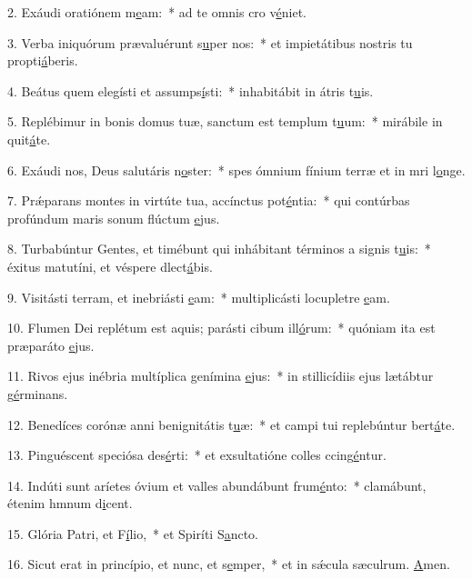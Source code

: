 2. Exáudi oratiónem m\uline{e}am:~* ad te omnis cro v\uline{é}niet.\par 
3. Verba iniquórum prævaluérunt s\uline{u}per nos:~* et impietátibus nostris tu propti\uline{á}beris.\par 
4. Beátus quem elegísti et assumps\uline{í}sti:~* inhabitábit in átris t\uline{u}is.\par 
5. Replébimur in bonis domus tuæ, sanctum est templum t\uline{u}um:~* mirábile in quit\uline{á}te.\par 
6. Exáudi nos, Deus salutáris n\uline{o}ster:~* spes ómnium fínium terræ et in mri l\uline{o}nge.\par 
7. Prǽparans montes in virtúte tua, accínctus pot\uline{é}ntia:~* qui contúrbas profúndum maris sonum flúctum \uline{e}jus.\par 
8. Turbabúntur Gentes, et timébunt qui inhábitant términos a signis t\uline{u}is:~* éxitus matutíni, et véspere dlect\uline{á}bis.\par 
9. Visitásti terram, et inebriásti \uline{e}am:~* multiplicásti locupletre \uline{e}am.\par 
10. Flumen Dei replétum est aquis; parásti cibum ill\uline{ó}rum:~* quóniam ita est præparáto \uline{e}jus.\par 
11. Rivos ejus inébria multíplica genímina \uline{e}jus:~* in stillicídiis ejus lætábtur g\uline{é}rminans.\par 
12. Benedíces corónæ anni benignitátis t\uline{u}æ:~* et campi tui replebúntur bert\uline{á}te.\par 
13. Pinguéscent speciósa des\uline{é}rti:~* et exsultatióne colles ccing\uline{é}ntur.\par 
14. Indúti sunt aríetes óvium et valles abundábunt frum\uline{é}nto:~* clamábunt, étenim hmnum d\uline{i}cent.\par 
15. Glória Patri, et F\uline{í}lio,~* et Spiríti S\uline{a}ncto.\par 
16. Sicut erat in princípio, et nunc, et s\uline{e}mper,~* et in sǽcula sæculrum. \uline{A}men.\par 
